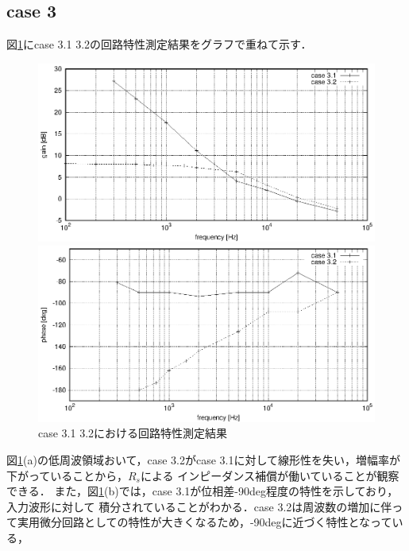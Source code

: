 \documentclass[dvipdfmx,titlepage,a4j]{jsarticle}  %
\begin{document}
\subsection{case 3}
図\ref{fig:gr:case3}にcase 3.1 3.2の回路特性測定結果をグラフで重ねて示す．
\begin{figure}[H]
  \centering
  \begin{minipage}{8cm}
    \centering
    \includegraphics[keepaspectratio, scale=0.6]{../data/case3-g.eps}
  \end{minipage}
  \begin{minipage}{8cm}
    \centering
    \includegraphics[keepaspectratio, scale=0.6]{../data/case3-f.eps}
  \end{minipage}
  \caption{case 3.1 3.2における回路特性測定結果}
  \label{fig:gr:case3}
\end{figure}

図\ref{fig:gr:case3}(a)の低周波領域おいて，case 3.2がcase 3.1に対して線形性を失い，増幅率が下がっていることから，$R_s$による
インピーダンス補償が働いていることが観察できる．
また，図\ref{fig:gr:case3}(b)では，case 3.1が位相差-90deg程度の特性を示しており，入力波形に対して
積分されていることがわかる．case 3.2は周波数の増加に伴って実用微分回路としての特性が大きくなるため，-90degに近づく特性となっている，
\end{document}
